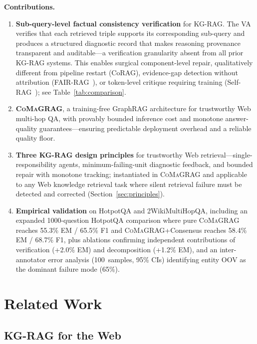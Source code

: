 \documentclass[runningheads]{llncs}
\newcommand{\sys}{\textsc{CoMaGRAG}\xspace}
\begin{document}
\smallskip\noindent\textbf{Contributions.}
\begin{enumerate}
  \item \textbf{Sub-query-level factual consistency verification} for KG-RAG.
        The VA verifies that each retrieved triple supports its corresponding
        sub-query and produces a structured diagnostic record that makes
        reasoning provenance transparent and auditable---a verification
        granularity absent from all prior KG-RAG systems. This enables
        surgical component-level repair, qualitatively different from pipeline
        restart (CoRAG), evidence-gap detection without attribution
        (FAIR-RAG~\cite{fairrag2025}), or token-level critique requiring
        training (Self-RAG~\cite{asai2023selfrag}); see
        Table~\ref{tab:comparison}.
  \item \textbf{\sys}, a training-free GraphRAG architecture for trustworthy
        Web multi-hop QA, with provably bounded inference cost and monotone
        answer-quality guarantees---ensuring predictable deployment overhead
        and a reliable quality floor.
  \item \textbf{Three KG-RAG design principles} for trustworthy Web
        retrieval---single-responsibility agents, minimum-failing-unit
        diagnostic feedback, and bounded repair with monotone tracking;
        instantiated in \sys and applicable to any Web knowledge retrieval
        task where silent retrieval failure must be detected and corrected
        (Section~\ref{sec:principles}).
  \item \textbf{Empirical validation} on HotpotQA and 2WikiMultiHopQA,
        including an expanded 1000-question HotpotQA comparison where pure
        \sys reaches 55.3\% EM / 65.5\% F1 and \sys+Consensus reaches
        58.4\% EM / 68.7\% F1, plus ablations confirming independent
        contributions of verification (+2.0\% EM) and decomposition
        (+1.2\% EM), and an inter-annotator error analysis (100~samples,
        95\% CIs) identifying entity OOV as the dominant failure mode (65\%).
\end{enumerate}

\section{Related Work}
\label{sec:related}

\subsection{KG-RAG for the Web}
\end{document}
